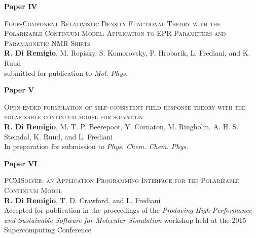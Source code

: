 

\thispagestyle{empty}
\vspace*{\fill}
\begin{flushright}
\Huge{\textbf{Paper IV}}
\end{flushright}

\Large{
\textsc{
    Four-Component Relativistic Density Functional Theory with the
    Polarizable Continuum Model: Application to EPR Parameters
    and Paramagnetic NMR Shifts
}
\\
  \textbf{R. Di Remigio}, M. Repisky, S. Komorovsky, P. Hrobarik, L.
  Frediani, and K. Ruud
\\
  submitted for publication to \textit{Mol. Phys.}
}
\vspace*{\fill}

%

\thispagestyle{empty}
\vspace*{\fill}
\begin{flushright}
\Huge{\textbf{Paper V}}
\end{flushright}

\Large{
\textsc{
    Open-ended formulation of self-consistent field response theory with
    the polarizable continuum model for solvation
}
\\
    \textbf{R. Di Remigio}, M. T. P. Beerepoot, Y. Cornaton, M. Ringholm,
    A. H. S. Steindal, K. Ruud, and L. Frediani
\\
    In preparation for submission to \textit{Phys. Chem. Chem. Phys.}
}
\vspace*{\fill}

%

\thispagestyle{empty}
\vspace*{\fill}
\begin{flushright}
\Huge{\textbf{Paper VI}}
\end{flushright}

\Large{
\textsc{
  PCMSolver: an Application Programming Interface
  for the Polarizable Continuum Model
}
\\
    \textbf{R. Di Remigio}, T. D. Crawford, and L. Frediani
\\
  Accepted for publication in the proceedings of the
  \emph{Producing High Performance and Sustainable Software for
  Molecular Simulation} workshop held at the 2015 Supercomputing
  Conference
}
\vspace*{\fill}



